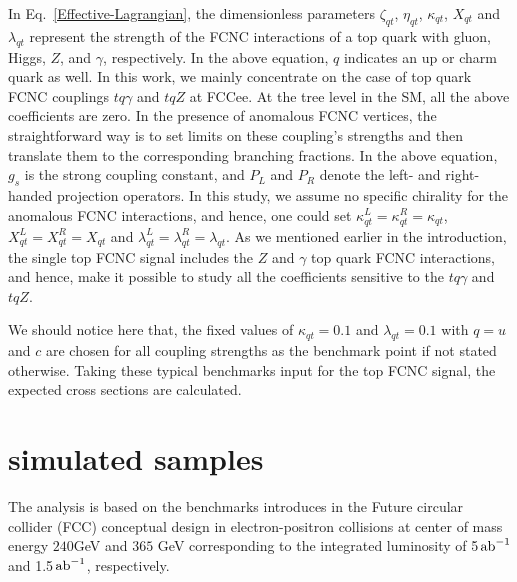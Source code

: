 \documentclass[11pt,onecolumn,english,showpacs,preprintnumbers,amsmath,amssymb,floatfix,nofootinbib]{revtex4-1}
\newcommand{\inab}{\,{\rm ab}^{-1}}
\begin{document}
In Eq.~\eqref{Effective-Lagrangian}, the dimensionless parameters $\zeta_{qt}$, 
$\eta_{qt}$, $\kappa_{qt}$, $X_{qt}$ and $\lambda_{qt}$ represent the 
strength of the FCNC 
interactions of a top quark with gluon, Higgs, $Z$, and $\gamma$, respectively. 
In the above equation, $q$ indicates an up or charm quark as well.
In this work, we mainly concentrate on the case of top quark FCNC
couplings $tq\gamma$ and  $tqZ$ at FCCee.
At the tree level in the SM, all the above coefficients are zero.
In the presence of anomalous FCNC vertices, the straightforward way is to 
set limits on these coupling's strengths and then translate them to the  
corresponding branching fractions. 
In the above equation, $g_s$ is the strong coupling constant, 
and $P_{L}$ and  $P_{R}$  denote 
the left- and right-handed projection operators. 
In this study, we assume no specific chirality 
for the anomalous FCNC interactions, and hence, one could 
set $\kappa_{qt}^{L} =  \kappa_{qt}^{R} = \kappa_{qt}$,  
$X_{qt}^{L} =  X_{qt}^{R} = X_{qt}$  and $\lambda_{qt}^{L} =  \lambda_{qt}^{R} = \lambda_{qt}$. 
As we mentioned earlier in the introduction, 
the single top FCNC signal includes the $Z$ and $\gamma$ top quark FCNC 
interactions, and hence, make it possible to study all the coefficients 
sensitive to the $tq\gamma$ and  $tqZ$.

We should notice here that, the fixed values of
$\kappa_{qt} = 0.1$ and $\lambda_{qt} = 0.1$ with
$q = u$ and $c$ are chosen for all coupling strengths as the 
benchmark point if not stated otherwise. 
Taking these typical
benchmarks input for the top FCNC signal, the expected
cross sections are calculated.




%
\section{simulated samples}\label{sec:strategy}
The analysis is based on the benchmarks introduces in the Future circular collider (FCC) conceptual design  in electron-positron collisions at center of mass energy $240 $GeV and $365$ GeV corresponding to the integrated luminosity of 5$\inab$ and 1.5$\inab$, respectively. 
\end{document}

